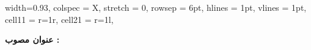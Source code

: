 \begin{table}[H]
	\label{Segment: 4}
	\begin{tblr}{
			width=0.93\textwidth,
			colspec = {X},
			stretch = 0,
			rowsep = 6pt,
			hlines = {1pt},
			vlines = {1pt},
			cell{1}{1} = {r=1}{r},
			cell{2}{1} = {r=1}{l},
		}
		
		\textbf{عنوان مصوب :}
		\ApprovedTitleFarsi
		\\	
		\begin{latin}
			\justifying
			\noindent
			\textbf{}
			\ApprovedTitleEnglish
		\end{latin}	

		
		\\	
	\end{tblr}
\end{table}
